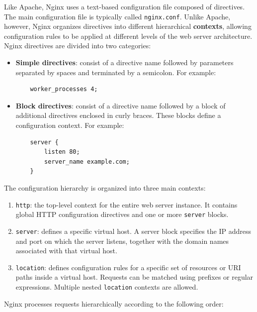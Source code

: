 \documentclass{scrbook}
\begin{document}
	Like Apache, Nginx uses a text-based configuration file composed of directives. The main configuration file is typically called \texttt{nginx.conf}. Unlike Apache, however, Nginx organizes directives into different hierarchical \textbf{contexts}, allowing configuration rules to be applied at different levels of the web server architecture.	Nginx directives are divided into two categories:
	\begin{itemize}
		\item \textbf{Simple directives}: consist of a directive name followed by parameters separated by spaces and terminated by a semicolon. For example:
		
		\begin{lstlisting}
	worker_processes 4;
		\end{lstlisting}
		
		\item \textbf{Block directives}: consist of a directive name followed by a block of additional directives enclosed in curly braces. These blocks define a configuration context. For example:
		
		\begin{lstlisting}
	server {
		listen 80;
		server_name example.com;
	}
		\end{lstlisting}
	\end{itemize}
	
	The configuration hierarchy is organized into three main contexts:
	
	\begin{enumerate}
		\item \texttt{http}: the top-level context for the entire web server instance. It contains global HTTP configuration directives and one or more \texttt{server} blocks.
		
		\item \texttt{server}: defines a specific virtual host. A server block specifies the IP address and port on which the server listens, together with the domain names associated with that virtual host.
		
		\item \texttt{location}: defines configuration rules for a specific set of resources or URI paths inside a virtual host. Requests can be matched using prefixes or regular expressions. Multiple nested \texttt{location} contexts are allowed.
	\end{enumerate}
	
	Nginx processes requests hierarchically according to the following order:
	
\end{document}
